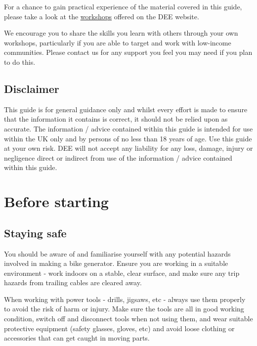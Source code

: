 \documentclass{article}
\theoremstyle{definition}
\theoremstyle{definition}
\theoremstyle{remark}
\begin{document}
    For a chance to gain practical experience of the material covered in this guide, please take a look at the \href{https://www.demandenergyequality.org/our-workshops/}{\underline{workshops}} offered on the DEE website.

    We encourage you to share the skills you learn with others through your own workshops, particularly if you are able to target and work with low-income communities. Please contact us for any support you feel you may need if you plan to do this.


  {\color{blue}\subsection{Disclaimer}} %
  \label{sub:disclaimer}

    This guide is for general guidance only and whilst every effort is made to ensure that the information it contains is correct, it should not be relied upon as accurate. The information / advice contained within this guide is intended for use within the UK only and by persons of no less than 18 years of age. Use this guide at your own risk. DEE will not accept any liability for any loss, damage, injury or negligence direct or indirect from use of the information / advice contained within this guide.


  \newpage  


{\color{blue}\section{Before starting}} %
\label{sec:before_starting}

  {\color{blue}\subsection{Staying safe}} %
  \label{sub:staying_safe}

    You should be aware of and familiarise yourself with any potential hazards involved in making a bike generator. Ensure you are working in a suitable environment - work indoors on a stable, clear surface, and make sure any trip hazards from trailing cables are cleared away. 

    When working with power tools - drills, jigsaws, etc - always use them properly to avoid the risk of harm or injury. Make sure the tools are all in good working condition, switch off and disconnect tools when not using them, and wear suitable protective equipment (safety glasses, gloves, etc) and avoid loose clothing or accessories that can get caught in moving parts.
\end{document}
